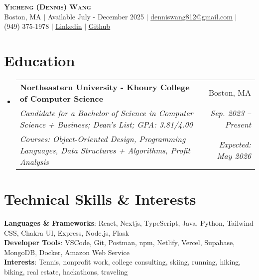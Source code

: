 \documentclass[letterpaper,11pt]{article}
\makeatletter
\newcommand{\eduSubheading}[6]{
  \vspace{-2pt}\item
    \begin{tabular*}{0.97\textwidth}[t]{l@{\extracolsep{\fill}}r}
      \textbf{#1} & #2 \\
      \vspace{-2pt}
      \textit{\small#3} & \hspace{-10cm}\textit{\small #4} \\
      
      \textit{\footnotesize#5}&\textit{\small #6} \\
    \end{tabular*}\vspace{-6pt}
}
\newcommand{\resumeSubHeadingListStart}{\begin{itemize}[leftmargin=0.15in, label={}]}
\newcommand{\resumeSubHeadingListEnd}{\end{itemize}}
\makeatother
\begin{document}

\begin{center}
\textbf{\Huge \scshape Yicheng (Dennis) Wang} \\ \vspace{1pt}
\small Boston, MA  $|$ Available July - December 2025 $|$ \href{mailto:denniswang812@gmail.com}{\underline{denniswang812@gmail.com}} $|$ (949) 375-1978 $|$ \href{https://www.linkedin.com/in/denniswang812/}{\underline{Linkedin}} $|$ \href{https://github.com/denniwang}{\underline{Github}} 
\end{center} 


\section{Education}
  \resumeSubHeadingListStart
    \eduSubheading
      {Northeastern University - Khoury College of Computer Science}{Boston, MA}
      {Candidate for a Bachelor of Science in Computer Science + Business; Dean's List; GPA: 3.81/4.00 } {Sep. 2023 -- Present}
       {Courses: Object-Oriented Design, Programming Languages, Data Structures + Algorithms, Profit Analysis}{Expected: May 2026}
  \resumeSubHeadingListEnd


\section{Technical Skills \& Interests}
 \begin{itemize}[leftmargin=0.15in, label={}]
    \small{\item{
     \textbf{Languages \& Frameworks}{: React, Nextjs, TypeScript, Java, Python, Tailwind CSS, Chakra UI, Express, Node.js, Flask} \\
     \textbf{Developer Tools}{: VSCode, Git, Postman, npm, Netlify, Vercel, Supabase, MongoDB, Docker,  Amazon Web Service} \\
     \textbf{Interests}{: Tennis, nonprofit work, college consulting, skiing, running, hiking, biking, real estate, hackathons, traveling}
     \vspace{-5pt}
    }}
    
 \end{itemize}

\end{document}

